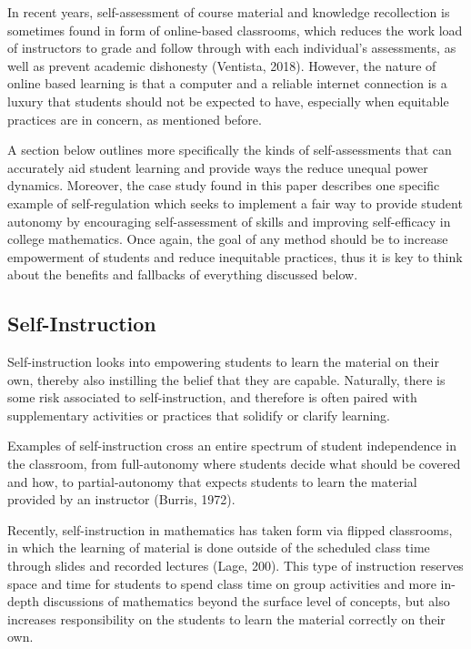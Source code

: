 In recent years, self-assessment of course material and knowledge recollection is sometimes found in form of online-based classrooms, which reduces the work load of instructors to grade and follow through with each individual's assessments, as well as prevent academic dishonesty (Ventista, 2018). However, the nature of online based learning is that a computer and a reliable internet connection is a luxury that students should not be expected to have, especially when equitable practices are in concern, as mentioned before.

A section below outlines more specifically the kinds of self-assessments that can accurately aid student learning and provide ways the reduce unequal power dynamics. Moreover, the case study found in this paper describes one specific example of self-regulation which seeks to implement a fair way to provide student autonomy by encouraging self-assessment of skills and improving self-efficacy in college mathematics. Once again, the goal of any method should be to increase empowerment of students and reduce inequitable practices, thus it is key to think about the benefits and fallbacks of everything discussed below.

\subsection{Self-Instruction}
Self-instruction looks into empowering students to learn the material on their own, thereby also instilling the belief that they are capable. Naturally, there is some risk associated to self-instruction, and therefore is often paired with supplementary activities or practices that solidify or clarify learning.

Examples of self-instruction cross an entire spectrum of student independence in the classroom, from full-autonomy where students decide what should be covered and how, to partial-autonomy that expects students to learn the material provided by an instructor (Burris, 1972).

Recently, self-instruction in mathematics has taken form via flipped classrooms, in which the learning of material is done outside of the scheduled class time through slides and recorded lectures (Lage, 200). This type of instruction reserves space and time for students to spend class time on group activities and more in-depth discussions of mathematics beyond the surface level of concepts, but also increases responsibility on the students to learn the material correctly on their own.

